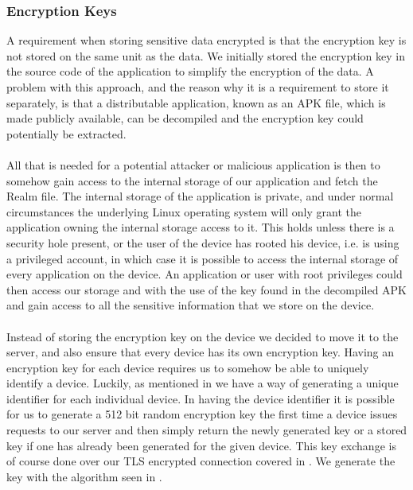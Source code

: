 \subsubsection{Encryption Keys}
\label{sub:encryption_keys}
A requirement when storing sensitive data encrypted is that the encryption key is not stored on the same unit as the data. We initially stored the encryption key in the source code of the application to simplify the encryption of the data. A problem with this approach, and the reason why it is a requirement to store it separately, is that a distributable application, known as an APK file, which is made publicly available, can be decompiled and the encryption key could potentially be extracted. 
\\\\
All that is needed for a potential attacker or malicious application is then to somehow gain access to the internal storage of our application and fetch the Realm file. The internal storage of the application is private, and under normal circumstances the underlying Linux operating system will only grant the application owning the internal storage access to it. This holds unless there is a security hole present, or the user of the device has rooted his device, i.e. is using a privileged account, in which case it is possible to access the internal storage of every application on the device. An application or user with root privileges could then access our storage and with the use of the key found in the decompiled APK and gain access to all the sensitive information that we store on the device.
\\\\
Instead of storing the encryption key on the device we decided to move it to the server, and also ensure that every device has its own encryption key. Having an encryption key for each device requires us to somehow be able to uniquely identify a device. Luckily, as mentioned in  we have a way of generating a unique identifier for each individual device. In having the device identifier it is possible for us to generate a 512 bit random encryption key the first time a device issues requests to our server and then simply return the newly generated key or a stored key if one has already been generated for the given device. This key exchange is of course done over our TLS encrypted connection covered in . We generate the key with the algorithm seen in . 



